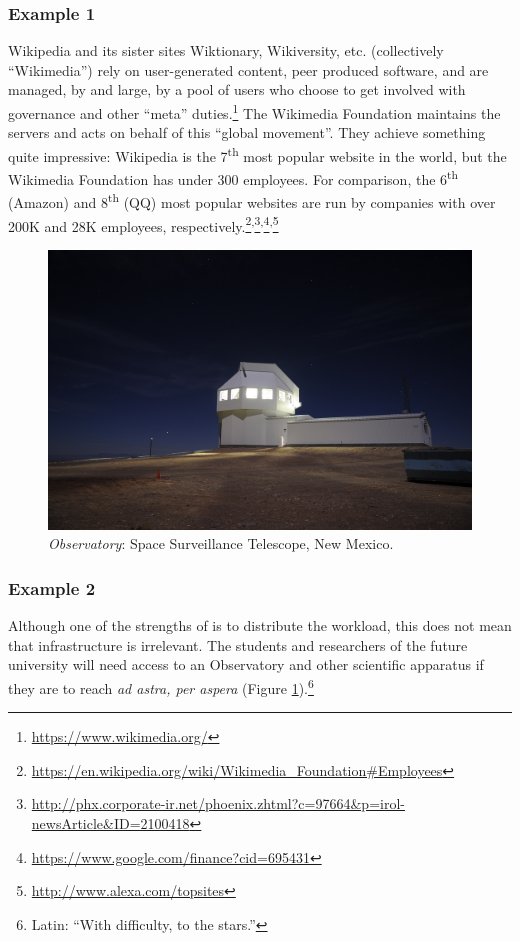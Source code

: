 \subsubsection*{Example 1} Wikipedia and its sister sites Wiktionary, Wikiversity, etc. (collectively ``Wikimedia'') rely on user-generated content,
peer produced software, and are managed, by and large, by a pool of users who choose to
get involved with governance and other ``meta'' duties.\footnote{\url{https://www.wikimedia.org/}}
%
The Wikimedia Foundation maintains the servers and acts on behalf of
this ``global movement''.  They achieve something quite impressive:
Wikipedia is the 7\textsuperscript{th} most popular website in the
world, but the Wikimedia Foundation has under 300 employees.  For
comparison, the 6\textsuperscript{th} (Amazon) and
8\textsuperscript{th} (QQ) most popular websites are run by companies
with over 200K and 28K employees,
respectively.\footnote{\url{https://en.wikipedia.org/wiki/Wikimedia_Foundation\#Employees}}\textsuperscript{,}\footnote{\url{http://phx.corporate-ir.net/phoenix.zhtml?c=97664&p=irol-newsArticle&ID=2100418}}\textsuperscript{,}\footnote{\url{https://www.google.com/finance?cid=695431}}\textsuperscript{,}\footnote{\url{http://www.alexa.com/topsites}}


\begin{figure}
\vspace{-.65cm}
\begin{center}
\includegraphics[width=.48\textwidth,trim=0 170 0 250, clip=true]{Space_Surveillance_Telescope}
\end{center}
\vspace{-.5cm}
\captionsetup{font=footnotesize,width=.48\textwidth}
\caption{\textsl{Observatory}: Space Surveillance Telescope, New Mexico.
\label{space-surveillance}}
\vspace{-1.1cm}
\end{figure}

\subsubsection*{Example 2} Although one of the strengths of  is to
distribute the workload, this does not mean that infrastructure is
irrelevant.  The students and
researchers of the future university will need access to an
Observatory and other scientific apparatus if they are to
reach \emph{ad astra, per aspera} (Figure \ref{space-surveillance}).\footnote{Latin: ``With difficulty, to the stars.''}

